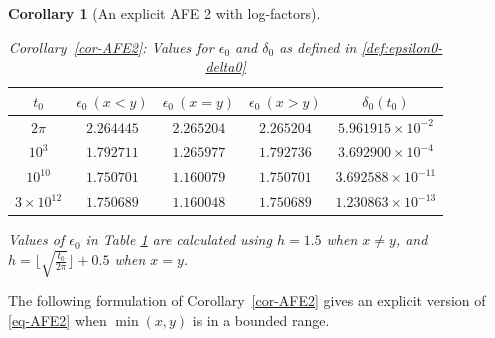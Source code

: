 \documentclass[11pt,letterpaper,oneside,reqno]{amsart}
\renewcommand{\^}[1]{\widehat{#1}}
\numberwithin{equation}{section}
\newtheorem{corollary}{Corollary}[theorem]
\theoremstyle{remark}
\newcommand*{\corref}[1]{Corollary~\ref{#1}}
\begin{document}
\begin{corollary}[An explicit AFE 2 with log-factors]
\begin{table}[H]
\centering
\caption{\corref{cor-AFE2}: Values for $\epsilon_0$ and $\delta_0$ as defined in \eqref{def:epsilon0-delta0}}
\label{tab:epsilon0_maxima}
\begin{tabular}{|c|c|c|c|c|}
\hline
$t_0$ & $\epsilon_0 \ (x < y)$ & $\epsilon_0 \ (x = y)$ & $\epsilon_0 \ (x > y)$ & $\delta_0(t_0)$ \\ \hline
$2\pi$ & $2.264445$ & $ 2.265204$ & $2.265204$ & $5.961915 \times 10^{-2}$ \\ \hline
$10^3$ & $1.792711$ & $1.265977$ & $1.792736$ & $3.692900 \times 10^{-4}$ \\ \hline
$10^{10}$ & $1.750701$ & $1.160079$ & $1.750701$ & $3.692588 \times 10^{-11}$ \\ \hline
$3 \times 10^{12}$ & $1.750689$ & $1.160048$ & $1.750689$ & $1.230863 \times 10^{-13}$ \\ \hline
\end{tabular}
\end{table}
Values of $\epsilon_0$ in Table \ref{tab:epsilon0_maxima} are calculated using $h=1.5$ when $x \neq y$, and $h=\lfloor \sqrt{\frac{t_0}{2\pi}}\rfloor +0.5$ when $x=y$.
\end{corollary}
The following formulation of \corref{cor-AFE2} gives an explicit version of \eqref{eq-AFE2} when $\min(x,y)$ is in a bounded range. 
\end{document}
